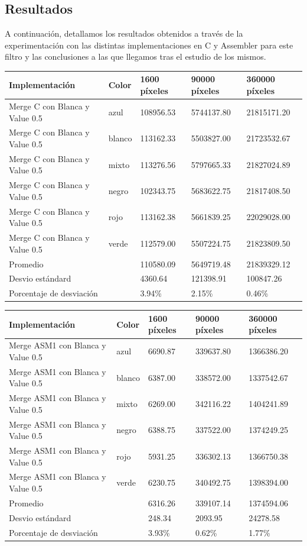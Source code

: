 \subsection{Resultados}
A continuación, detallamos los resultados obtenidos a través de la experimentación con las distintas implementaciones en C y Assembler para este filtro y las conclusiones a las que llegamos tras el estudio de los mismos.

\begin{tabular}{| l | l | l | l | l |}
\hline
Implementación & Color & 1600 píxeles & 90000 píxeles & 360000 píxeles\\
\hline
Merge C con Blanca y Value 0.5 & azul & 108956.53 &	5744137.80	& 21815171.20\\ 
\hline
Merge C con Blanca y Value 0.5 & blanco & 113162.33	& 5503827.00	& 21723532.67\\ 
\hline
Merge C con Blanca y Value 0.5 & mixto & 113276.56	& 5797665.33	& 21827024.89\\ 
\hline
Merge C con Blanca y Value 0.5 & negro & 102343.75	& 5683622.75 &	21817408.50\\
\hline
Merge C con Blanca y Value 0.5 & rojo & 113162.38	& 5661839.25	& 22029028.00\\
\hline
Merge C con Blanca y Value 0.5 & verde & 112579.00	& 5507224.75	& 21823809.50\\ 
\hline
Promedio & &  110580.09	& 5649719.48	& 21839329.12\\
\hline
Desvio estándard  && 4360.64	& 121398.91	& 100847.26\\
\hline
Porcentaje de desviación  && 3.94\%	& 2.15\%	& 0.46\%\\
\hline
\end{tabular}

\begin{tabular}{| l | l | l | l | l |}
\hline
Implementación & Color & 1600 píxeles & 90000 píxeles & 360000 píxeles\\
\hline
Merge ASM1 con Blanca y Value 0.5 & azul & 6690.87	& 339637.80	& 1366386.20\\ 
\hline
Merge ASM1 con Blanca y Value 0.5 & blanco & 6387.00	& 338572.00	& 1337542.67\\ 
\hline
Merge ASM1 con Blanca y Value 0.5 & mixto & 6269.00	& 342116.22 & 	1404241.89\\ 
\hline
Merge ASM1 con Blanca y Value 0.5 & negro & 6388.75 & 337522.00 & 	1374249.25\\
\hline
Merge ASM1 con Blanca y Value 0.5 & rojo & 5931.25	& 336302.13 & 	1366750.38\\
\hline
Merge ASM1 con Blanca y Value 0.5 & verde & 6230.75	& 340492.75	& 1398394.00\\ 
\hline
Promedio & &  6316.26 & 	339107.14 & 	1374594.06\\
\hline
Desvio estándard  && 248.34	& 2093.95	& 24278.58\\
\hline
Porcentaje de desviación  && 3.93\%	& 0.62\% &	1.77\%\\
\hline
\end{tabular}

